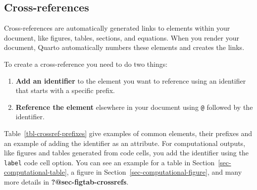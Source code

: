 \documentclass[
  letterpaper,
  DIV=11,
  numbers=noendperiod,
  oneside]{scrreprt}
\begin{document}
\begin{tcolorbox}
\section{Cross-references}\label{sec-crossreferences}

Cross-references are automatically generated links to elements within
your document, like figures, tables, sections, and equations. When you
render your document, Quarto automatically numbers these elements and
creates the links.

To create a cross-reference you need to do two things:

\begin{enumerate}
\def\labelenumi{\arabic{enumi}.}
\item
  \textbf{Add an identifier} to the element you want to reference using
  an identifier that starts with a specific prefix.
\item
  \textbf{Reference the element} elsewhere in your document using
  \texttt{@} followed by the identifier.
\end{enumerate}

Table~\ref{tbl-crossref-prefixes} give examples of common elements,
their prefixes and an example of adding the identifier as an attribute.
For computational outputs, like figures and tables generated from code
cells, you add the identifier using the \texttt{label} code cell option.
You can see an example for a table in
Section~\ref{sec-computational-table}, a figure in
Section~\ref{sec-computational-figure}, and many more details in
\textbf{?@sec-figtab-crossrefs}.


\end{tcolorbox}
\end{document}
